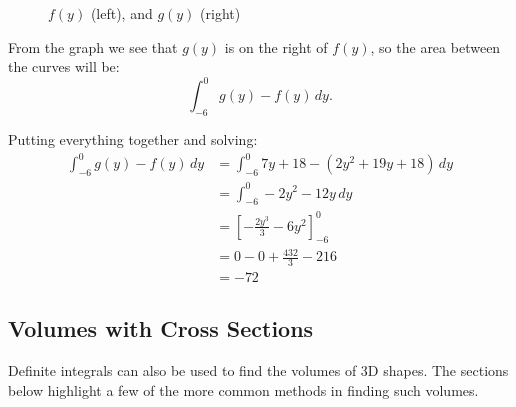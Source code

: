 \documentclass[12pt]{article}
\begin{document}
\begin{figure}[H]
	\begin{center}
		\caption{$f(y)$ (left), and $g(y)$ (right)}
		\label{fig:abcy1}
	\end{center}
\end{figure}

From the graph we see that $g(y)$ is on the right of $f(y)$, so the area between the curves will be:
\[ \int_{-6}^0 g(y) - f(y) \, dy. \]

\noindent Putting everything together and solving:
\begin{align*}
	\int_{-6}^0 g(y) - f(y) \, dy & = \int_{-6}^0 7y + 18 - (2y^2 + 19y + 18) \, dy \\
	& = \int_{-6}^0 -2y^2 - 12y \, dy                 \\
	& = \left[ -\frac{2y^3}{3} - 6y^2 \right]_{-6}^0  \\[6pt]
	& = 0 - 0 + \frac{432}{3} - 216                   \\[6pt]
	& = -72
\end{align*}

\subsection{Volumes with Cross Sections}
Definite integrals can also be used to find the volumes of 3D shapes. The sections below highlight a few of the more common methods in finding such volumes.
\end{document}
